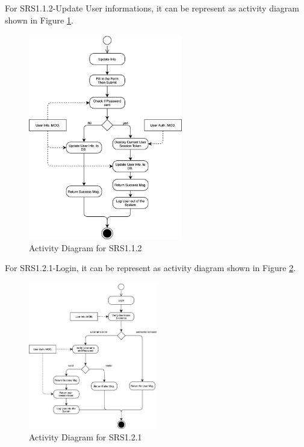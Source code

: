 For SRS1.1.2-Update User informations, it can be represent as activity diagram shown in Figure \ref{fig:srs_diagram_2}.

\begin{figure}[t]
	\centering
	\includegraphics[width=0.6\textwidth]{./img/srs_diagram_2.png}
	\caption{Activity Diagram for SRS1.1.2}
	\label{fig:srs_diagram_2}
\end{figure}

For SRS1.2.1-Login, it can be represent as activity diagram shown in Figure \ref{fig:srs_diagram_3}.

\begin{figure}[t]
	\centering
	\includegraphics[width=0.5\textwidth]{./img/srs_diagram_3.png}
	\caption{Activity Diagram for SRS1.2.1}
	
	\label{fig:srs_diagram_3}
\end{figure}


